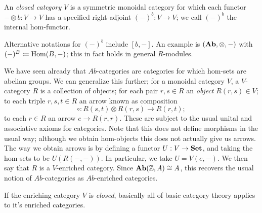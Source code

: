 \begin{definition}\label{dfn:7.9}
	An \emph{closed category} $V$ is a symmetric monoidal category for which each functor $-\otimes b : V \to V$ has a specified right-adjoint $(-)^b : V \to V$; we call $(-)^b$ the internal hom-functor.
\end{definition}
Alternative notations for $(-)^b$ include $[b,-]$. An example is $(\mathbf{Ab},\otimes ,-)$ with $(-)^B\coloneqq \operatorname{Hom}(B, -) $; this in fact holds in general $R$-modules.

We have seen already that $Ab$-categories are categories for which hom-sets are abelian groups. We can generalize this further; for a monoidal category $V$, a $V$-category $R$ is a collection of objects; for each pair $r,s\in R$ an \emph{object} $R(r,s)\in V$; to each triple $r,s,t\in R$ an arrow known as composition
\[
	\circ : R(s,t)\otimes R(r,s) \to R(r,t)
;\]
to each $r\in R$ an arrow $e\to R(r,r)$. These are subject to the usual unital and associative axioms for categories. Note that this does not define morphisms in the usual way; although we obtain hom-objects this does not actually give us arrows. The way we obtain arrows is by defining a functor $U : V \to \mathbf{Set} $, and taking the hom-sets to be $U(R(-,-))$. In particular, we take $U=V(e,-)$. We then say that $R$ is a $V$-enriched category. Since $\mathbf{Ab}(\mathbb{Z} ,A)\cong A$, this recovers the usual notion of $Ab$-categories as $Ab$-enriched categories.

If the enriching category $V$ is \emph{closed}, basically all of basic category theory applies to it's enriched categories.
